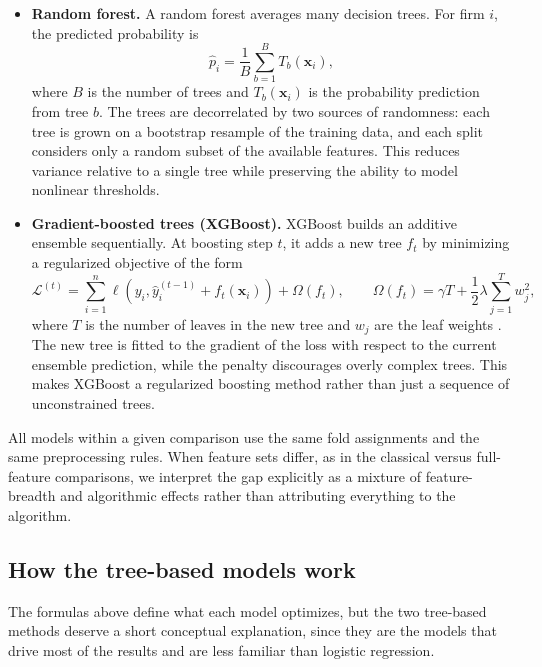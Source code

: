 \documentclass[12pt,a4paper]{article}
\begin{document}
\begin{itemize}
\item \textbf{Random forest.} A random forest averages many decision trees. For
firm $i$, the predicted probability is
\begin{equation}
\hat{p}_i = \frac{1}{B}\sum_{b=1}^{B} T_b(\mathbf{x}_i),
\label{eq:rf-prediction}
\end{equation}
where $B$ is the number of trees and $T_b(\mathbf{x}_i)$ is the probability
prediction from tree $b$. The trees are decorrelated by two sources of
randomness: each tree is grown on a bootstrap resample of the training data,
and each split considers only a random subset of the available features. This
reduces variance relative to a single tree while preserving the ability to
model nonlinear thresholds.

\item \textbf{Gradient-boosted trees (XGBoost).} XGBoost builds an additive
ensemble sequentially. At boosting step $t$, it adds a new tree $f_t$ by
minimizing a regularized objective of the form
\begin{equation}
\mathcal{L}^{(t)} = \sum_{i=1}^{n} \ell\!\left(y_i,
\hat{y}_i^{(t-1)} + f_t(\mathbf{x}_i)\right) + \Omega(f_t),
\qquad
\Omega(f_t)=\gamma T + \frac{1}{2}\lambda \sum_{j=1}^{T} w_j^2,
\label{eq:xgb-objective}
\end{equation}
where $T$ is the number of leaves in the new tree and $w_j$ are the leaf
weights \citep{chen2016}. The new tree is fitted to the gradient of the loss
with respect to the current ensemble prediction, while the penalty discourages
overly complex trees. This makes XGBoost a regularized boosting method rather
than just a sequence of unconstrained trees.
\end{itemize}

All models within a given comparison use the same fold assignments and the
same preprocessing rules. When feature sets differ, as in the classical versus
full-feature comparisons, we interpret the gap explicitly as a mixture of
feature-breadth and algorithmic effects rather than attributing everything to
the algorithm.

\subsection{How the tree-based models work}
\label{sec:ml-theory}

The formulas above define what each model optimizes, but the two tree-based
methods deserve a short conceptual explanation, since they are the models that
drive most of the results and are less familiar than logistic regression.
\end{document}
